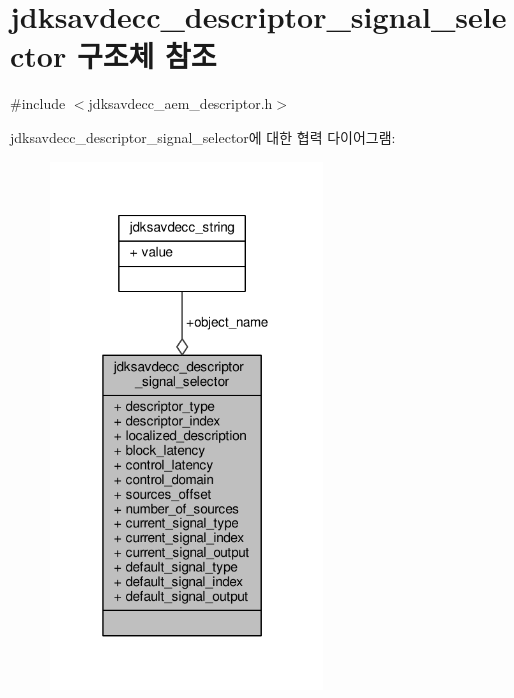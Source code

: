\hypertarget{structjdksavdecc__descriptor__signal__selector}{}\section{jdksavdecc\+\_\+descriptor\+\_\+signal\+\_\+selector 구조체 참조}
\label{structjdksavdecc__descriptor__signal__selector}


{\ttfamily \#include $<$jdksavdecc\+\_\+aem\+\_\+descriptor.\+h$>$}



jdksavdecc\+\_\+descriptor\+\_\+signal\+\_\+selector에 대한 협력 다이어그램\+:
\nopagebreak
\begin{figure}[H]
\begin{center}
\leavevmode
\includegraphics[width=205pt]{structjdksavdecc__descriptor__signal__selector__coll__graph}
\end{center}
\end{figure}
